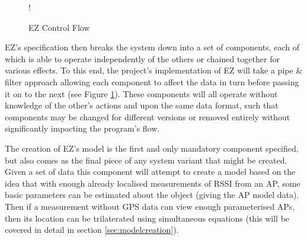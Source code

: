 \documentclass{UoYCSproject}
\begin{document}
            \begin{figure}[h]
            \label{fig:EZControl}
            \centering
            \resizebox {\textwidth} {!} {
	        }
            \caption{EZ Control Flow}
	        \end{figure}
            
            EZ's specification then breaks the system down into a set of components, each of which is able to operate independently of the others or chained together for various effects. To this end, the project's implementation of EZ will take a pipe \& filter approach allowing each component to affect the data in turn before passing it on to the next (see Figure \ref{fig:EZControl}). These components will all operate without knowledge of the other's actions and upon the same data format, such that components may be changed for different versions or removed entirely without significantly impacting the program's flow.
            
            The creation of EZ's model is the first and only mandatory component specified, but also comes as the final piece of any system variant that might be created. Given a set of data this component will attempt to create a model based on the idea that with enough already localised measurements of RSSI from an AP, some basic parameters can be estimated about the object (giving the AP model data). Then if a measurement without GPS data can view enough parameterised APs, then its location can be trilaterated using simultaneous equations (this will be covered in detail in section \ref{sec:modelcreation}).
            
\end{document}
